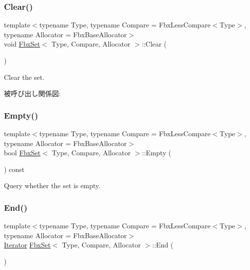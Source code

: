 \subsubsection{\texorpdfstring{Clear()}{Clear()}}
{\footnotesize\ttfamily template$<$typename Type, typename Compare = Fbx\+Less\+Compare$<$\+Type$>$, typename Allocator = Fbx\+Base\+Allocator$>$ \\
void \hyperlink{class_fbx_set}{Fbx\+Set}$<$ Type, Compare, Allocator $>$\+::Clear (\begin{DoxyParamCaption}{ }\end{DoxyParamCaption})}



Clear the set. 

被呼び出し関係図\+:
\mbox{\label{class_fbx_set_a453c342954283c8c7add25804a915b44}} 
\subsubsection{\texorpdfstring{Empty()}{Empty()}}
{\footnotesize\ttfamily template$<$typename Type, typename Compare = Fbx\+Less\+Compare$<$\+Type$>$, typename Allocator = Fbx\+Base\+Allocator$>$ \\
bool \hyperlink{class_fbx_set}{Fbx\+Set}$<$ Type, Compare, Allocator $>$\+::Empty (\begin{DoxyParamCaption}{ }\end{DoxyParamCaption}) const}



Query whether the set is empty. 

\mbox{\label{class_fbx_set_aff72352a00b11a896a960f4b562971de}} 
\subsubsection{\texorpdfstring{End()}{End()}\hspace{0.1cm}{\footnotesize\ttfamily [1/2]}}
{\footnotesize\ttfamily template$<$typename Type, typename Compare = Fbx\+Less\+Compare$<$\+Type$>$, typename Allocator = Fbx\+Base\+Allocator$>$ \\
\hyperlink{class_fbx_set_ad1b543e0f63f04f4d2dc8e9e3da9bcaa}{Iterator} \hyperlink{class_fbx_set}{Fbx\+Set}$<$ Type, Compare, Allocator $>$\+::End (\begin{DoxyParamCaption}{ }\end{DoxyParamCaption})}



